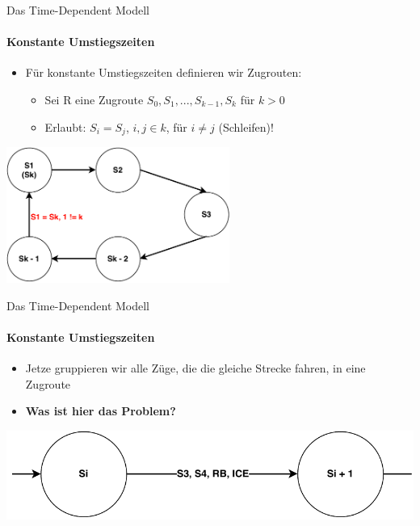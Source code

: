 \begin{frame}{Das Time-Dependent Modell}
	\framesubtitle{Konstante Umstiegszeiten}
	\begin{itemize}
		\item Für konstante Umstiegszeiten definieren wir Zugrouten:
		\begin{itemize}
			\item Sei R eine Zugroute $S_0,S_1,...,S_{k - 1}, S_k$ für $k > 0$
			\pause
			\item Erlaubt: $S_i = S_j$, $i,j \in k$, für $i \neq j$ (Schleifen)!
		\end{itemize}
	\end{itemize}
	
	\begin{center}
		\includegraphics[height=12em]{images/time-dependent/zugroute.pdf}
	\end{center}
\end{frame}


\begin{frame}{Das Time-Dependent Modell}
	\framesubtitle{Konstante Umstiegszeiten}
	\begin{itemize}
		\item Jetze gruppieren wir alle Züge, die die gleiche Strecke fahren, in eine Zugroute
		\item \textbf{Was ist hier das Problem?}
	\end{itemize}
	
	\begin{center}
		\includegraphics[width=\linewidth]{images/time-dependent/zugroute-problem.pdf}
	\end{center}
\end{frame}


